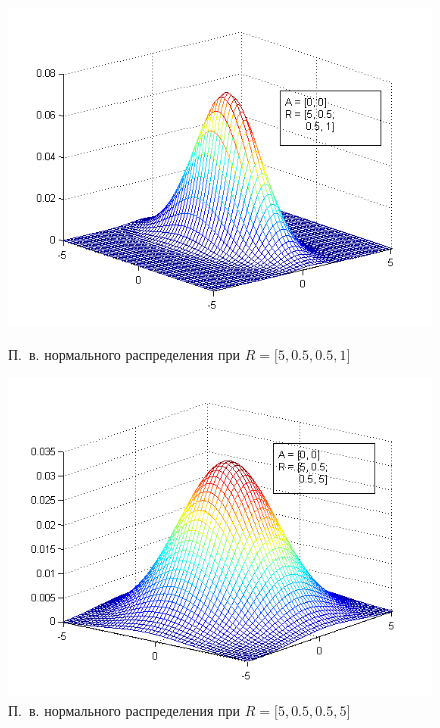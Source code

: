 \begin{figure}[h!]
  \begin{minipage}[h!]{0.47\linewidth}
    \includegraphics[width=1\linewidth]{pic/new/normal_mesh_3}
    \caption{П.~в. нормального распределения при
    $ R = \big[5, 0.5, 0.5, 1 \big] $}
  \end{minipage}
  \hfill
  \begin{minipage}[h!]{0.47\linewidth}
    \includegraphics[width=1\linewidth]{pic/new/normal_mesh_4}
    \caption{П.~в. нормального распределения при
    $ R = \big[5, 0.5, 0.5, 5 \big] $}
    \label{pic:normal_mesh_end}
  \end{minipage}
\end{figure}

